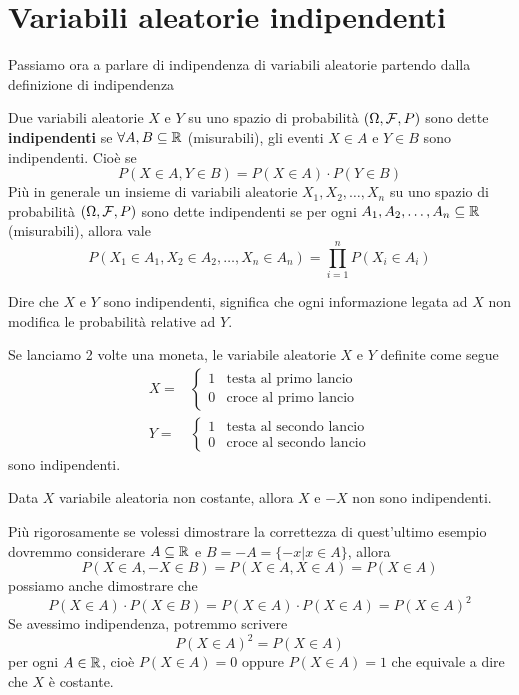 \section{Variabili aleatorie indipendenti}
Passiamo ora a parlare di indipendenza di variabili aleatorie partendo dalla definizione di
indipendenza

\begin{definition}
	Due variabili aleatorie $X$ e $Y$ su uno spazio di probabilità $(\Omega, \mathcal{F}, P)$ sono dette
	\textbf{indipendenti} se $\forall A, B \subseteq \mathbb{R}$ (misurabili), gli eventi $X \in A$ e
	$Y \in B$ sono indipendenti. Cioè se
	\[ P(X \in A, Y \in B) = P(X \in A) \cdot P(Y \in B) \]
	Più in generale un insieme di variabili aleatorie $X_1, X_2, \dots, X_n$ su uno spazio di
	probabilità $(\Omega, \mathcal{F}, P)$ sono dette indipendenti se per ogni
	$A_1, A_2, \dots, A_n \subseteq \mathbb{R}$ (misurabili), allora vale
	\[ P(X_1 \in A_1, X_2 \in A_2, \dots, X_n \in A_n) = \prod_{i=1}^n P(X_i \in A_i) \]
\end{definition}

Dire che $X$ e $Y$ sono indipendenti, significa che ogni informazione legata ad $X$ non modifica
le probabilità relative ad $Y$.

\begin{example}
	Se lanciamo 2 volte una moneta, le variabile aleatorie $X$ e $Y$ definite come segue
	\begin{align*}
		X = & \begin{cases}
			      1 & \text{testa al primo lancio} \\
			      0 & \text{croce al primo lancio}
		      \end{cases}   \\[1ex]
		Y = & \begin{cases}
			      1 & \text{testa al secondo lancio} \\
			      0 & \text{croce al secondo lancio}
		      \end{cases}
	\end{align*}
	sono indipendenti.
\end{example}

\begin{example}
	Data $X$ variabile aleatoria non costante, allora $X$ e $-X$ non sono indipendenti.
\end{example}

Più rigorosamente se volessi dimostrare la correttezza di quest'ultimo esempio dovremmo considerare
$A \subseteq \mathbb{R}$ e $B = -A = \{ -x | x \in A \}$, allora
\[ P(X \in A, -X \in B) = P(X \in A, X \in A) = P(X \in A) \]
possiamo anche dimostrare che
\[ P(X \in A) \cdot P(X \in B) = P(X \in A) \cdot P(X \in A) = P(X \in A)^2 \]
Se avessimo indipendenza, potremmo scrivere
\[ P(X \in A)^2 = P(X \in A) \]
per ogni $A \in \mathbb{R}$, cioè $P(X \in A) = 0$ oppure $P(X \in A) = 1$ che equivale a dire che $X$ è
costante.